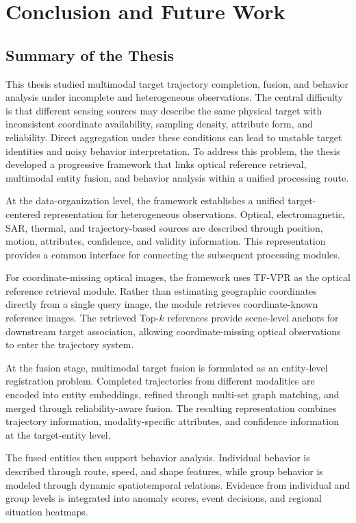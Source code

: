 \chapter{Conclusion and Future Work}

\section{Summary of the Thesis}
This thesis studied multimodal target trajectory completion, fusion, and behavior analysis under incomplete and heterogeneous observations. The central difficulty is that different sensing sources may describe the same physical target with inconsistent coordinate availability, sampling density, attribute form, and reliability. Direct aggregation under these conditions can lead to unstable target identities and noisy behavior interpretation. To address this problem, the thesis developed a progressive framework that links optical reference retrieval, multimodal entity fusion, and behavior analysis within a unified processing route.

At the data-organization level, the framework establishes a unified target-centered representation for heterogeneous observations. Optical, electromagnetic, SAR, thermal, and trajectory-based sources are described through position, motion, attributes, confidence, and validity information. This representation provides a common interface for connecting the subsequent processing modules.

For coordinate-missing optical images, the framework uses TF-VPR as the optical reference retrieval module. Rather than estimating geographic coordinates directly from a single query image, the module retrieves coordinate-known reference images. The retrieved Top-\(k\) references provide scene-level anchors for downstream target association, allowing coordinate-missing optical observations to enter the trajectory system.

At the fusion stage, multimodal target fusion is formulated as an entity-level registration problem. Completed trajectories from different modalities are encoded into entity embeddings, refined through multi-set graph matching, and merged through reliability-aware fusion. The resulting representation combines trajectory information, modality-specific attributes, and confidence information at the target-entity level.

The fused entities then support behavior analysis. Individual behavior is described through route, speed, and shape features, while group behavior is modeled through dynamic spatiotemporal relations. Evidence from individual and group levels is integrated into anomaly scores, event decisions, and regional situation heatmaps.

